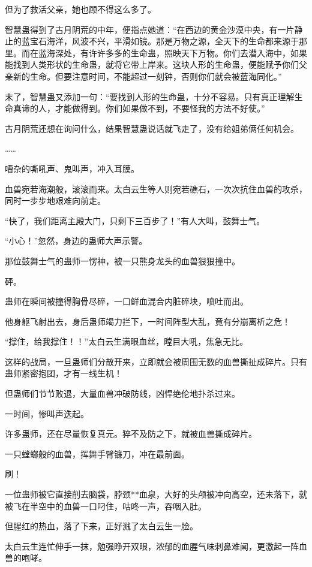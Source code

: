 \begin{this_body}
但为了救活父亲，她也顾不得这么多了。

智慧蛊得到了古月阴荒的中年，便指点她道：“在西边的黄金沙漠中央，有一片静止的蓝宝石海洋，风波不兴，平滑如镜。那是万物之源，全天下的生命都来源于那里。而在蓝海深处，有许许多多的生命蛊，照映天下万物。你们去潜入海中，如果能找到人类形状的生命蛊，就将它带上岸来。这块人形的生命蛊，便能赋予你们父亲新的生命。但要注意时间，不能超过一刻钟，否则你们就会被蓝海同化。”

末了，智慧蛊又添加一句：“要找到人形的生命蛊，十分不容易。只有真正理解生命真谛的人，才能做得到。你们如果做不到，不要怪我的方法不好使。”

古月阴荒还想在询问什么，结果智慧蛊说话就飞走了，没有给姐弟俩任何机会。

……

嘈杂的嘶吼声、鬼叫声，冲入耳膜。

血兽宛若海潮般，滚滚而来。太白云生等人则宛若礁石，一次次抗住血兽的攻杀，同时一步步地艰难向前走。

“快了，我们距离主殿大门，只剩下三百步了！”有人大叫，鼓舞士气。

“小心！”忽然，身边的蛊师大声示警。

那位鼓舞士气的蛊师一愣神，被一只熊身龙头的血兽狠狠撞中。

砰。

蛊师在瞬间被撞得胸骨尽碎，一口鲜血混合内脏碎块，喷吐而出。

他身躯飞射出去，身后蛊师竭力拦下，一时间阵型大乱，竟有分崩离析之危！

“撑住，给我撑住！！”太白云生满眼血丝，瞠目大吼，焦急无比。

这样的战局，一旦蛊师们分散开来，立即就会被周围无数的血兽撕扯成碎片。只有蛊师紧密抱团，才有一线生机！

但蛊师们节节败退，大量血兽冲破防线，凶悍绝伦地扑杀过来。

一时间，惨叫声迭起。

许多蛊师，还在尽量恢复真元。猝不及防之下，就被血兽撕成碎片。

一只螳螂般的血兽，挥舞手臂镰刀，冲在最前面。

刷！

一位蛊师被它直接削去脑袋，脖颈**血泉，大好的头颅被冲向高空，还未落下，就被飞在半空中的血兽一口叼住，咕咚一声，吞咽入肚。

但腥红的热血，落了下来，正好溅了太白云生一脸。

太白云生连忙伸手一抹，勉强睁开双眼，浓郁的血腥气味刺鼻难闻，更激起一阵血兽的咆哮。


\end{this_body}
